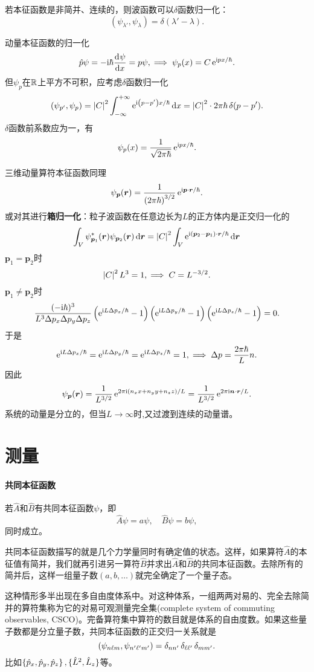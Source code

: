 若本征函数是非简并、连续的，则波函数可以$\delta$函数归一化：%
\[
	(\psi_{\lambda'},\psi_\lambda)=\delta(\lambda'-\lambda).
\]
\begin{example}{动量本征函数的归一化}{}
	\[
		\hat p\psi=-\mathrm{i}\hbar\frac{\mathrm{d}^{{}}\psi}{\mathrm{d}{x}^{{}}}=p\psi,\implies\psi_p(x)=C\mathop{}\!\mathrm{e}^{\mathrm{i} px/\hbar}.
	\]
	但$\psi_p$在$\mathbb R$上平方不可积，应考虑$\delta$函数归一化
	\[
		(\psi_{p'},\psi_p)=\left\lvert C\right\rvert^2\int_{-\infty}^{+\infty}\mathop{}\!\mathrm{e}^{\mathrm{i}\left(p-p'\right)x/\hbar}\mathop{}\!\mathrm{d} x=\left\lvert C\right\rvert^2\cdot 2\pi\hbar\mathop{}\!\delta(p-p').
	\]
	$\delta$函数前系数应为一，有
	\[
		\psi_p(x)=\frac1{\sqrt{2\pi\hbar}}\mathop{}\!\mathrm{e}^{\mathrm{i} px/\hbar}.
	\]
	
	三维动量算符本征函数同理
	\[
		\psi_{\bm p}(\bm r)=\frac1{\left(2\pi\hbar\right)^{3/2}}\mathop{}\!\mathrm{e}^{\mathrm{i}\bm p\cdot\bm r/\hbar}.
	\]
	\tcblower
	或对其进行\textbf{箱归一化}：粒子波函数在任意边长为$L$的正方体内是正交归一化的
	\[
		\int_V\psi_{\bm p_1}^\ast(\bm r)\psi_{\bm p_2}(\bm r)\mathop{}\!\mathrm{d}\bm r=\left\lvert C\right\rvert^2\int_V\mathop{}\!\mathrm{e}^{\mathrm{i}(\bm p_2-\bm p_1)\cdot\bm r/\hbar}\mathop{}\!\mathrm{d}\bm r
	\]
	$\bm p_1=\bm p_2$时
	\[
		\left\lvert C\right\rvert^2L^3=1,\implies C=L^{-3/2}.
	\]
	$\bm p_1\neq\bm p_2$时
	\[
		\frac{(-\mathrm{i}\hbar)^3}{L^3\Delta p_x\Delta p_y\Delta p_z}\left(\mathop{}\!\mathrm{e}^{\mathrm{i} L\Delta p_x/\hbar}-1\right)\left(\mathop{}\!\mathrm{e}^{\mathrm{i} L\Delta p_y/\hbar}-1\right)\left(\mathop{}\!\mathrm{e}^{\mathrm{i} L\Delta p_z/\hbar}-1\right)=0.
	\]
	于是
	\[
		\mathop{}\!\mathrm{e}^{\mathrm{i} L\Delta p_x/\hbar}=\mathop{}\!\mathrm{e}^{\mathrm{i} L\Delta p_y/\hbar}=\mathop{}\!\mathrm{e}^{\mathrm{i} L\Delta p_z/\hbar}=1,\implies\Delta p=\frac{2\pi\hbar}Ln.
	\]
	因此
	\[
		\psi_{\bm p}(\bm r)=\frac1{L^{3/2}}\mathop{}\!\mathrm{e}^{2\pi\mathrm{i}(n_xx+n_yy+n_zz)/L}=\frac1{L^{3/2}}\mathop{}\!\mathrm{e}^{2\pi\mathrm{i}\bm n\cdot\bm r/L}.
	\]
	系统的动量是分立的，但当$L\to\infty$时,又过渡到连续的动量谱。
\end{example}
\section{测量}
\paragraph{共同本征函数}
若$\hat A$和$\hat B$有共同本征函数$\psi$，即
\[
	\hat A\psi=a\psi,\quad\hat B\psi=b\psi,
\]
同时成立。

共同本征函数描写的就是几个力学量同时有确定值的状态。这样，如果算符$\hat A$的本征值有简并，我们就再引进另一算符$\hat B$并求出$\hat A$和$\hat B$的共同本征函数。去除所有的简并后，这样一组量子数$(a,b,\ldots)$就完全确定了一个量子态。

这种情形多半出现在多自由度体系中。对这种体系，一组两两对易的、完全去除简并的算符集称为它的对易可观测量完全集(complete system of commuting observables, CSCO)。完备算符集中算符的数目就是体系的自由度数。如果这些量子数都是分立量子数，共同本征函数的正交归一关系就是
\[
	\left(\psi_{n\ell m},\psi_{n'\ell'm'}\right)=\mathop{}\!\delta_{nn'}\mathop{}\!\delta_{\ell\ell'}\mathop{}\!\delta_{mm'}.
\]
比如$\left\{\hat p_x,\hat p_y,\hat p_z\right\},\{\hat L^2,\hat L_z\}$等。


